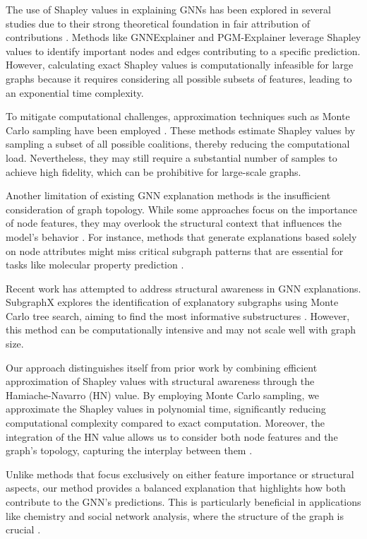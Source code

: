 \documentclass{article}
\begin{document}
The use of Shapley values in explaining GNNs has been explored in several studies due to their strong theoretical foundation in fair attribution of contributions \cite{arXiv:2102.05152v2, arXiv:2010.05788v1}. Methods like GNNExplainer and PGM-Explainer leverage Shapley values to identify important nodes and edges contributing to a specific prediction. However, calculating exact Shapley values is computationally infeasible for large graphs because it requires considering all possible subsets of features, leading to an exponential time complexity.

To mitigate computational challenges, approximation techniques such as Monte Carlo sampling have been employed \cite{arXiv:2108.12055v1}. These methods estimate Shapley values by sampling a subset of all possible coalitions, thereby reducing the computational load. Nevertheless, they may still require a substantial number of samples to achieve high fidelity, which can be prohibitive for large-scale graphs.

Another limitation of existing GNN explanation methods is the insufficient consideration of graph topology. While some approaches focus on the importance of node features, they may overlook the structural context that influences the model's behavior \cite{arXiv:2207.12599v2}. For instance, methods that generate explanations based solely on node attributes might miss critical subgraph patterns that are essential for tasks like molecular property prediction \cite{arXiv:2201.12380v5}.

Recent work has attempted to address structural awareness in GNN explanations. SubgraphX explores the identification of explanatory subgraphs using Monte Carlo tree search, aiming to find the most informative substructures \cite{arXiv:2102.05152v2}. However, this method can be computationally intensive and may not scale well with graph size.

Our approach distinguishes itself from prior work by combining efficient approximation of Shapley values with structural awareness through the Hamiache-Navarro (HN) value. By employing Monte Carlo sampling, we approximate the Shapley values in polynomial time, significantly reducing computational complexity compared to exact computation. Moreover, the integration of the HN value allows us to consider both node features and the graph's topology, capturing the interplay between them \cite{arXiv:2201.12380v5}.

Unlike methods that focus exclusively on either feature importance or structural aspects, our method provides a balanced explanation that highlights how both contribute to the GNN's predictions. This is particularly beneficial in applications like chemistry and social network analysis, where the structure of the graph is crucial \cite{arXiv:2207.12599v2}.
\end{document}
